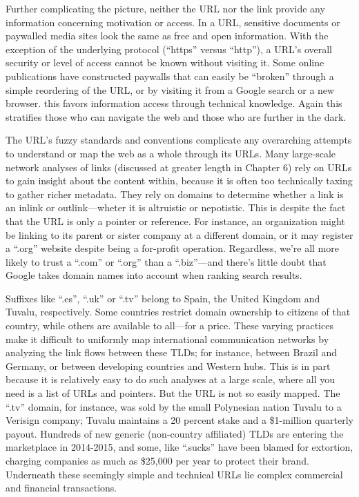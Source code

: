 Further complicating the picture, neither the URL nor the link provide any information concerning motivation or access. In a URL, sensitive documents or paywalled media sites look the same as free and open information. With the exception of the underlying protocol (``https'' versus ``http''), a URL's overall security or level of access cannot be known without visiting it. Some online publications have constructed paywalls that can easily be ``broken'' through a simple reordering of the URL, or by visiting it from a Google search or a new browser. this favors information access through technical knowledge.\autocite[See, e.g.,][]{benton_that_2011,smith_iv_heres_2015} Again this stratifies those who can navigate the web and those who are further in the dark.

The URL's fuzzy standards and conventions complicate any overarching attempts to understand or map the web as a whole through its URLs. Many large-scale network analyses of links (discussed at greater length in Chapter 6) rely on URLs to gain insight about the content within, because it is often too technically taxing to gather richer metadata. They rely on domains to determine whether a link is an inlink or outlink---wheter it is altruistic or nepotistic. This is despite the fact that the URL is only a pointer or reference. For instance, an organization might be linking to its parent or sister company at a different domain, or it may register a ``.org'' website despite being a for-profit operation. Regardless, we're all more likely to trust a ``.com'' or ``.org'' than a ``.biz''---and there's little doubt that Google takes domain names into account when ranking search results.\autocite[See][]{liversidge_whats_2012}

Suffixes like ``.es'', ``.uk'' or ``.tv'' belong to Spain, the United Kingdom and Tuvalu, respectively. Some countries restrict domain ownership to citizens of that country, while others are available to all---for a price. These varying practices make it difficult to uniformly map international communication networks by analyzing the link flows between these TLDs; for instance, between Brazil and Germany, or between developing countries and Western hubs.\autocite[See, e.g.,][]{chung_inferring_2013,fragoso_understanding_2011,himelboim_international_2010} This is in part because it is relatively easy to do such analyses at a large scale, where all you need is a list of URLs and pointers. But the URL is not so easily mapped. The ``.tv'' domain, for instance, was sold by the small Polynesian nation Tuvalu to a Verisign company; Tuvalu maintains a 20 percent stake and a \$1-million quarterly payout.\autocite{cave_i_2000} Hundreds of new generic (non-country affiliated) TLDs are entering the marketplace in 2014-2015, and some, like ``.sucks'' have been blamed for extortion, charging companies as much as \$25,000 per year to protect their brand.\autocite{noguchi_new_2015} Underneath these seemingly simple and technical URLs lie complex commercial and financial transactions.

